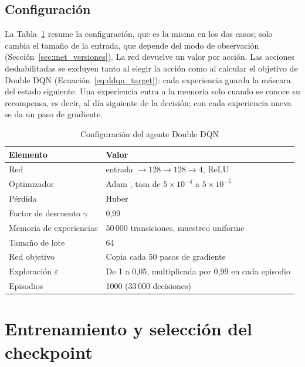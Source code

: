\subsection{Configuración}

La Tabla~\ref{tab:ddqn_config} resume la configuración, que es la misma en los dos casos; solo
cambia el tamaño de la entrada, que depende del modo de observación
(Sección~\ref{sec:met_versiones}). La red devuelve un valor por acción. Las acciones
deshabilitadas se excluyen tanto al elegir la acción como al calcular el objetivo de Double DQN
(Ecuación~\ref{eq:ddqn_target}): cada experiencia guarda la máscara del estado siguiente. Una
experiencia entra a la memoria solo cuando se conoce su recompensa, es decir, al día siguiente
de la decisión; con cada experiencia nueva se da un paso de gradiente.

\begin{table}[H]
    \centering
    \caption{Configuración del agente Double DQN}
    \label{tab:ddqn_config}
    \begin{tabular}{ll}
        \hline
        \textbf{Elemento} & \textbf{Valor} \\
        \hline
        Red                         & entrada $\rightarrow 128 \rightarrow 128 \rightarrow 4$, ReLU \\
        Optimizador                 & Adam \cite{kingma2015adam}, tasa de $5 \times 10^{-4}$ a $5 \times 10^{-5}$ \\
        Pérdida                     & Huber \\
        Factor de descuento $\gamma$ & 0,99 \\
        Memoria de experiencias     & 50\,000 transiciones, muestreo uniforme \\
        Tamaño de lote              & 64 \\
        Red objetivo                & Copia cada 50 pasos de gradiente \\
        Exploración $\varepsilon$   & De 1 a 0,05, multiplicada por 0,99 en cada episodio \\
        Episodios                   & 1000 (33\,000 decisiones) \\
        \hline
    \end{tabular}
\end{table}

\section{Entrenamiento y selección del checkpoint}
\label{sec:met_entrenamiento}

